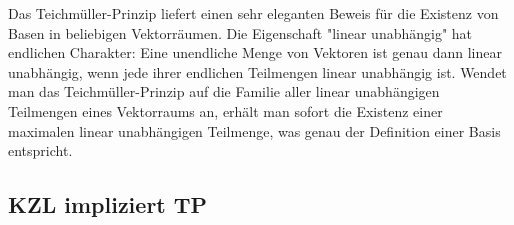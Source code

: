 \begin{didactic-insight}
Das Teichmüller-Prinzip liefert einen sehr eleganten Beweis für die Existenz von Basen in beliebigen Vektorräumen. Die Eigenschaft "linear unabhängig" hat endlichen Charakter: Eine unendliche Menge von Vektoren ist genau dann linear unabhängig, wenn jede ihrer endlichen Teilmengen linear unabhängig ist. Wendet man das Teichmüller-Prinzip auf die Familie aller linear unabhängigen Teilmengen eines Vektorraums an, erhält man sofort die Existenz einer maximalen linear unabhängigen Teilmenge, was genau der Definition einer Basis entspricht.
\end{didactic-insight}

\subsection{KZL impliziert TP}

